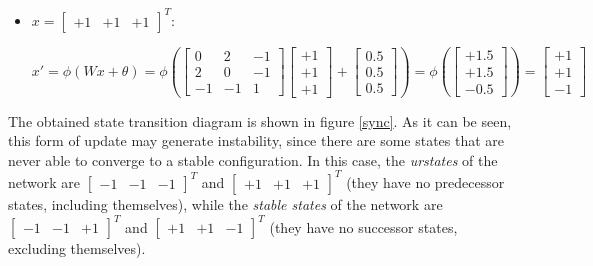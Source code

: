 \documentclass[letterpaper,headings=standardclasses]{scrartcl}
\begin{document}
\begin{itemize}
    \item $x = [\begin{matrix} +1 & +1 & +1 \end{matrix}]^T$:
    
    $$ x' = \phi(Wx + \theta) = \phi \left( \left[ \begin{matrix} 0 & 2 & -1 \\ 2 & 0 & -1 \\ -1 & -1 & 1 \end{matrix} \right] \left[ \begin{matrix} +1 \\ +1 \\ +1 \end{matrix} \right] + \left[ \begin{matrix} 0.5 \\ 0.5 \\ 0.5 \end{matrix} \right] \right) = \phi \left( \left[ \begin{matrix} +1.5 \\ +1.5 \\ -0.5 \end{matrix} \right] \right) = \left[ \begin{matrix} +1 \\ +1 \\ -1 \end{matrix} \right] $$
\end{itemize}

The obtained state transition diagram is shown in figure \ref{sync}. As it can be seen, this form of update may generate instability, since there are some states that are never able to converge to a stable configuration. In this case, the \emph{urstates} of the network are $[\begin{matrix} -1 & -1 & -1 \end{matrix}]^T$ and $[\begin{matrix} +1 & +1 & +1 \end{matrix}]^T$ (they have no predecessor states, including themselves), while the \emph{stable states} of the network are $[\begin{matrix} -1 & -1 & +1 \end{matrix}]^T$ and $[\begin{matrix} +1 & +1 & -1 \end{matrix}]^T$ (they have no successor states, excluding themselves).
\end{document}
